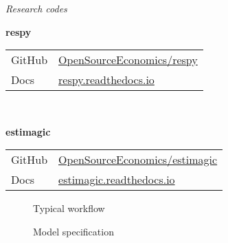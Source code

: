 \begin{frame}\begin{center}
  \Large\textit{Research codes}
\end{center}\end{frame}
\begin{frame}
\textbf{respy}\\\vspace{0.3cm}
\begin{tabular}{ll}
GitHub  & \url{OpenSourceEconomics/respy}\\
Docs    & \url{respy.readthedocs.io}\\
\end{tabular}\\\vspace{1cm}

\textbf{estimagic}\\\vspace{0.3cm}
\begin{tabular}{ll}
GitHub	& \url{OpenSourceEconomics/estimagic}\\
Docs    & \url{estimagic.readthedocs.io}\\
\end{tabular}

\end{frame}
\begin{frame}
  \begin{figure}\tiny
    \caption{Typical workflow}
         
   \end{figure}
\end{frame}
\begin{frame}

  \begin{figure}[h!]\centering
  \caption{Model specification}\label{Model specification}
  \hspace{0.3cm}
  \end{figure}

\end{frame}
